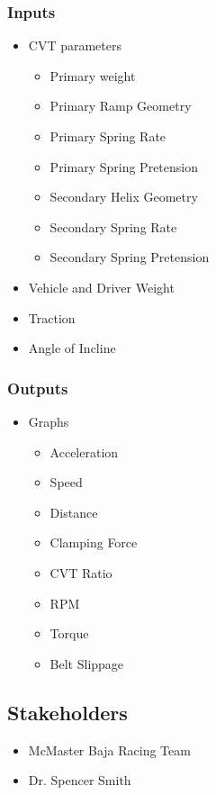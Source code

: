 \documentclass{article}
\begin{document}
\subsubsection{Inputs}
\begin{itemize}
    \item CVT parameters
    \begin{itemize}
        \item Primary weight
        \item Primary Ramp Geometry
        \item Primary Spring Rate
        \item Primary Spring Pretension
        \item Secondary Helix Geometry
        \item Secondary Spring Rate
        \item Secondary Spring Pretension
    \end{itemize}
    \item Vehicle and Driver Weight
    \item Traction
    \item Angle of Incline
\end{itemize}
\subsubsection{Outputs}
\begin{itemize}
    \item Graphs
    \begin{itemize}
        \item Acceleration
        \item Speed
        \item Distance
        \item Clamping Force
        \item CVT Ratio
        \item RPM
        \item Torque
        \item Belt Slippage
    \end{itemize}
\end{itemize}

\subsection{Stakeholders}
\begin{itemize}
    \item McMaster Baja Racing Team
    \item Dr. Spencer Smith
\end{itemize}
\end{document}
